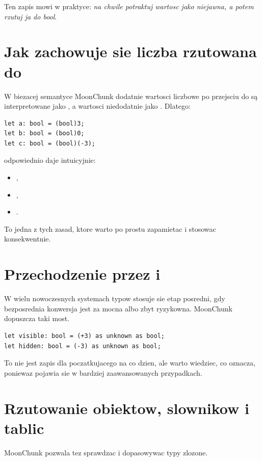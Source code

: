 Ten zapis mowi w praktyce: \emph{na chwile potraktuj wartosc jako niejawna, a potem
rzutuj ja do bool}.

\section{Jak zachowuje sie liczba rzutowana do }
W biezacej semantyce MoonChunk dodatnie wartosci liczbowe po przejsciu do 
są interpretowane jako , a wartosci niedodatnie jako .
Dlatego:

\begin{lstlisting}[style=moonchunk,caption={Przykladowe wyniki rzutowania liczby do bool}]
let a: bool = (bool)3;
let b: bool = (bool)0;
let c: bool = (bool)(-3);
\end{lstlisting}

odpowiednio daje intuicyjnie:

\begin{itemize}
  \item {},
  \item {},
  \item {}.
\end{itemize}

To jedna z tych zasad, ktore warto po prostu zapamietac i stosowac konsekwentnie.

\section{Przechodzenie przez  i }
W wielu nowoczesnych systemach typow stosuje sie etap posredni, gdy bezposrednia konwersja
jest za mocna albo zbyt ryzykowna. MoonChunk dopuszcza taki most.

\begin{lstlisting}[style=moonchunk,caption={Lancuch rzutowan}]
let visible: bool = (+3) as unknown as bool;
let hidden: bool = (-3) as unknown as bool;
\end{lstlisting}

To nie jest zapis dla poczatkujacego na co dzien, ale warto wiedziec, co oznacza,
poniewaz pojawia sie w bardziej zaawansowanych przypadkach.

\section{Rzutowanie obiektow, slownikow i tablic}
MoonChunk pozwala tez sprawdzac i dopasowywac typy zlozone.


